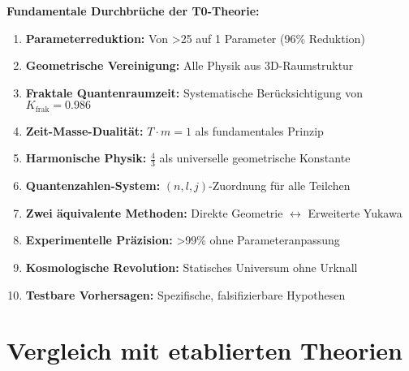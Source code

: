 \documentclass[12pt,a4paper]{article}
\begin{document}
	\begin{foundation}
		\textbf{Fundamentale Durchbrüche der T0-Theorie:}
		
		\begin{enumerate}
			\item \textbf{Parameterreduktion:} Von >25 auf 1 Parameter (96\% Reduktion)
			
			\item \textbf{Geometrische Vereinigung:} Alle Physik aus 3D-Raumstruktur
			
			\item \textbf{Fraktale Quantenraumzeit:} Systematische Berücksichtigung von $K_{\text{frak}} = 0.986$
			
			\item \textbf{Zeit-Masse-Dualität:} $T \cdot m = 1$ als fundamentales Prinzip
			
			\item \textbf{Harmonische Physik:} $\frac{4}{3}$ als universelle geometrische Konstante
			
			\item \textbf{Quantenzahlen-System:} $(n,l,j)$-Zuordnung für alle Teilchen
			
			\item \textbf{Zwei äquivalente Methoden:} Direkte Geometrie $\leftrightarrow$ Erweiterte Yukawa
			
			\item \textbf{Experimentelle Präzision:} >99\% ohne Parameteranpassung
			
			\item \textbf{Kosmologische Revolution:} Statisches Universum ohne Urknall
			
			\item \textbf{Testbare Vorhersagen:} Spezifische, falsifizierbare Hypothesen
		\end{enumerate}
	\end{foundation}
	
	\section{Vergleich mit etablierten Theorien}
	
\end{document}
